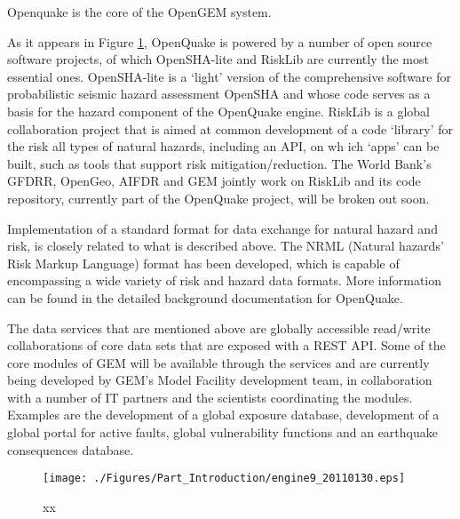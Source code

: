 Openquake is the core of the OpenGEM system. 

As it appears in Figure \ref{fig:oq_it}, OpenQuake is powered by a 
number of open source software projects, of which OpenSHA-lite and 
RiskLib are currently the most essential ones. 
OpenSHA-lite is a ‘light’ version of the comprehensive software for 
probabilistic seismic hazard assessment OpenSHA and whose code serves
as a basis for the hazard component of the OpenQuake engine. RiskLib 
is a global collaboration project that is aimed at common development 
of a code ‘library’ for the risk all types of natural hazards, including
an API, on wh ich ‘apps’ can be built, such as tools that support risk
mitigation/reduction. The World Bank’s GFDRR, OpenGeo, AIFDR and GEM 
jointly work on RiskLib and its code repository, currently part of 
the OpenQuake project, will be broken out soon.

Implementation of a standard format for data exchange for natural hazard
and risk,  is closely related to what is described above. The NRML 
(Natural hazards’ Risk Markup Language) format has been developed, which
is capable of encompassing a wide variety of risk and hazard data formats.
More information can be found in the detailed background documentation 
for OpenQuake.

The data services that are mentioned above are globally accessible 
read/write collaborations of core data sets that are exposed with a 
REST API. Some of the core modules of GEM will be available through 
the services and are currently being developed by GEM’s Model Facility 
development team, in collaboration with a number of IT partners and the 
scientists coordinating the modules. Examples are the development of a 
global exposure database, development of a global portal for active 
faults, global vulnerability functions and an earthquake consequences
database.
\begin{figure}
\texttt{[image: ./Figures/Part\_Introduction/engine9\_20110130.eps]}
\caption{xx}
\label{fig:oq_it}
\end{figure}


